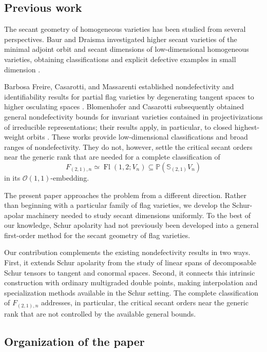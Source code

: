 \documentclass[a4paper,reqno]{amsart}
\theoremstyle{plainnopunct}
\theoremstyle{definitionnopunct}
\renewcommand{\P}{\mathbb{P}}
\renewcommand{\S}{\mathbb{S}}
\newcommand{\cO}{\mathcal{O}}
\DeclareMathOperator{\Fl}{Fl}
\begin{document}
\subsection{Previous work}

The secant geometry of homogeneous varieties has been studied from
several perspectives. Baur and Draisma investigated higher secant
varieties of the minimal adjoint orbit and secant dimensions of
low-dimensional homogeneous varieties, obtaining classifications and
explicit defective examples in small dimension
\cite{Baur2004,BD10}.

Barbosa Freire, Casarotti, and Massarenti established
nondefectivity and identifiability results for partial flag varieties
by degenerating tangent spaces to higher osculating spaces
\cite{BFCM22}. Blomenhofer and Casarotti subsequently obtained
general nondefectivity bounds for invariant varieties contained in
projectivizations of irreducible representations; their results
apply, in particular, to closed highest-weight orbits
\cite{BC23}. These works provide low-dimensional classifications and broad ranges
of nondefectivity. They do not, however, settle the critical secant
orders near the generic rank that are needed for a complete
classification of
\[
F_{(2,1),n}
\simeq
\Fl(1,2;V_n)
\subseteq
\P(\S_{(2,1)}V_n)
\]
in its $\cO(1,1)$-embedding.

The present paper approaches the problem from a different direction.
Rather than beginning with a particular family of flag varieties, we
develop the Schur-apolar machinery needed to study secant dimensions
uniformly. To the best of our knowledge, Schur apolarity had not
previously been developed into a general first-order method for the
secant geometry of flag varieties.

Our contribution complements the existing nondefectivity results in
two ways. First, it extends Schur apolarity from the study of linear
spans of decomposable Schur tensors to tangent and conormal spaces.
Second, it connects this intrinsic construction with ordinary
multigraded double points, making interpolation and specialization
methods available in the Schur setting. The complete classification
of $F_{(2,1),n}$ addresses, in particular, the critical secant orders
near the generic rank that are not controlled by the available
general bounds.

\subsection{Organization of the paper}
\end{document}
